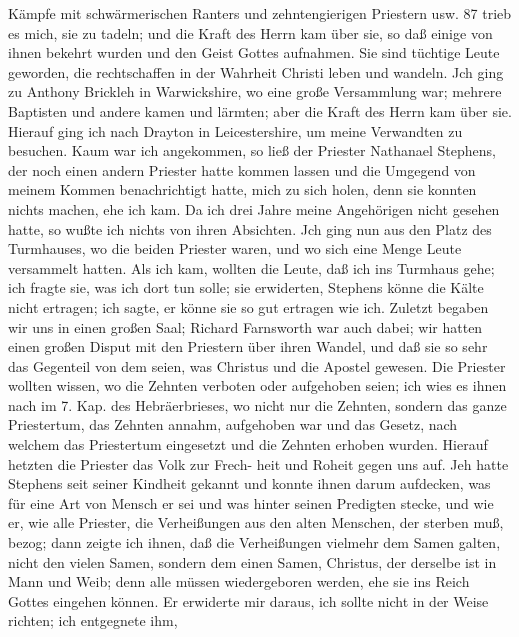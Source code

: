 Kämpfe mit schwärmerischen Ranters und zehntengierigen Priestern usw. 87
trieb es mich, sie zu tadeln; und die Kraft des Herrn kam über sie,
so daß einige von ihnen bekehrt wurden und den Geist Gottes
aufnahmen. Sie sind tüchtige Leute geworden, die rechtschaffen
in der Wahrheit Christi leben und wandeln. Jch ging zu Anthony
Brickleh in Warwickshire, wo eine große Versammlung war;
mehrere Baptisten und andere kamen und lärmten; aber die Kraft
des Herrn kam über sie.
Hierauf ging ich nach Drayton in Leicestershire, um meine
Verwandten zu besuchen. Kaum war ich angekommen, so ließ
der Priester Nathanael Stephens, der noch einen andern Priester
hatte kommen lassen und die Umgegend von meinem Kommen
benachrichtigt hatte, mich zu sich holen, denn sie konnten nichts
machen, ehe ich kam. Da ich drei Jahre meine Angehörigen
nicht gesehen hatte, so wußte ich nichts von ihren Absichten. Jch
ging nun aus den Platz des Turmhauses, wo die beiden
Priester waren, und wo sich eine Menge Leute versammelt hatten.
Als ich kam, wollten die Leute, daß ich ins Turmhaus gehe; ich
fragte sie, was ich dort tun solle; sie erwiderten, Stephens
könne die Kälte nicht ertragen; ich sagte, er könne sie so gut
ertragen wie ich. Zuletzt begaben wir uns in einen großen Saal;
Richard Farnsworth war auch dabei; wir hatten einen großen
Disput mit den Priestern über ihren Wandel, und daß sie so
sehr das Gegenteil von dem seien, was Christus und die Apostel
gewesen. Die Priester wollten wissen, wo die Zehnten verboten
oder aufgehoben seien; ich wies es ihnen nach im 7. Kap. des
Hebräerbrieses, wo nicht nur die Zehnten, sondern das ganze
Priestertum, das Zehnten annahm, aufgehoben war und das
Gesetz, nach welchem das Priestertum eingesetzt und die Zehnten
erhoben wurden. Hierauf hetzten die Priester das Volk zur Frech-
heit und Roheit gegen uns auf. Jeh hatte Stephens seit seiner
Kindheit gekannt und konnte ihnen darum aufdecken, was für
eine Art von Mensch er sei und was hinter seinen Predigten
stecke, und wie er, wie alle Priester, die Verheißungen aus den
alten Menschen, der sterben muß, bezog; dann zeigte ich ihnen,
daß die Verheißungen vielmehr dem Samen galten, nicht den
vielen Samen, sondern dem einen Samen, Christus, der derselbe
ist in Mann und Weib; denn alle müssen wiedergeboren werden,
ehe sie ins Reich Gottes eingehen können. Er erwiderte mir
daraus, ich sollte nicht in der Weise richten; ich entgegnete ihm,


